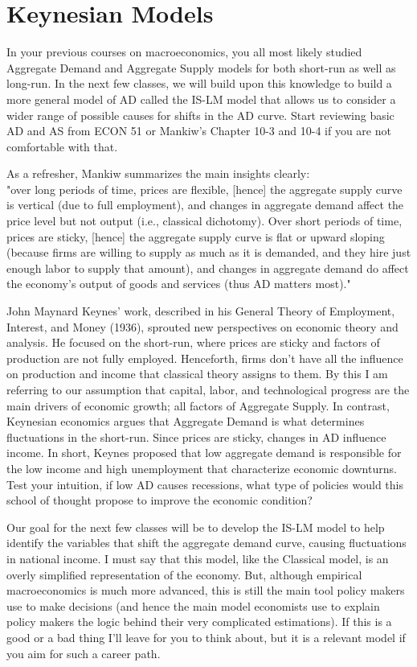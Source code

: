 \documentclass[10pt]{article}
\begin{document}
\section*{Keynesian Models}
In your previous courses on macroeconomics, you all most likely studied Aggregate Demand and Aggregate Supply models for both short-run as well as long-run. In the next few classes, we will build upon this knowledge to build a more general model of AD called the IS-LM model that allows us to consider a wider range of possible causes for shifts in the AD curve. Start reviewing basic AD and AS from ECON 51 or Mankiw's Chapter 10-3 and 10-4 if you are not comfortable with that.

As a refresher, Mankiw summarizes the main insights clearly:\\[0pt]
"over long periods of time, prices are flexible, [hence] the aggregate supply curve is vertical (due to full employment), and changes in aggregate demand affect the price level but not output (i.e., classical dichotomy). Over short periods of time, prices are sticky, [hence] the aggregate supply curve is flat or upward sloping (because firms are willing to supply as much as it is demanded, and they hire just enough labor to supply that amount), and changes in aggregate demand do affect the economy's output of goods and services (thus AD matters most)."

John Maynard Keynes' work, described in his General Theory of Employment, Interest, and Money (1936), sprouted new perspectives on economic theory and analysis. He focused on the short-run, where prices are sticky and factors of production are not fully employed. Henceforth, firms don't have all the influence on production and income that classical theory assigns to them. By this I am referring to our assumption that capital, labor, and technological progress are the main drivers of economic growth; all factors of Aggregate Supply. In contrast, Keynesian economics argues that Aggregate Demand is what determines fluctuations in the short-run. Since prices are sticky, changes in AD influence income. In short, Keynes proposed that low aggregate demand is responsible for the low income and high unemployment that characterize economic downturns. Test your intuition, if low AD causes recessions, what type of policies would this school of thought propose to improve the economic condition?

Our goal for the next few classes will be to develop the IS-LM model to help identify the variables that shift the aggregate demand curve, causing fluctuations in national income. I must say that this model, like the Classical model, is an overly simplified representation of the economy. But, although empirical macroeconomics is much more advanced, this is still the main tool policy makers use to make decisions (and hence the main model economists use to explain policy makers the logic behind their very complicated estimations). If this is a good or a bad thing I'll leave for you to think about, but it is a relevant model if you aim for such a career path.
\end{document}

